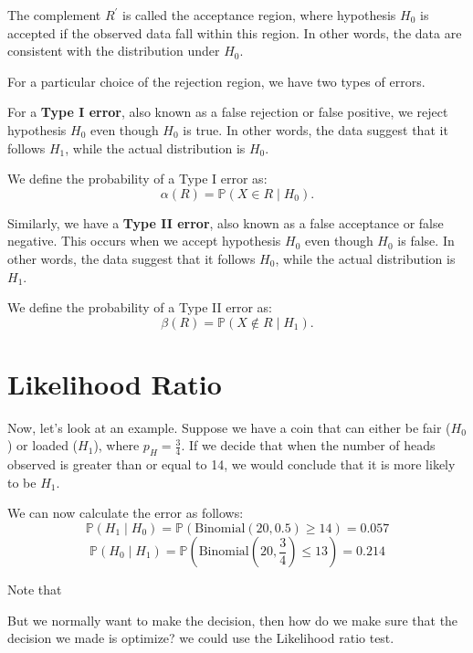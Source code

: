 The complement \(R^{\prime}\) is called the acceptance region, where hypothesis \(H_0\) is accepted if the observed data fall within this region. In other words, the data are consistent with the distribution under \(H_0\).

For a particular choice of the rejection region, we have two types of errors.

For a \textbf{Type I error}, also known as a false rejection or false positive, we reject hypothesis \(H_0\) even though \(H_0\) is true. In other words, the data suggest that it follows \(H_1\), while the actual distribution is \(H_0\).

We define the probability of a Type I error as:  
\[
  \alpha (R) = \mathbb{P}(X \in R \mid H_0).
\]

Similarly, we have a \textbf{Type II error}, also known as a false acceptance or false negative. This occurs when we accept hypothesis \(H_0\) even though \(H_0\) is false. In other words, the data suggest that it follows \(H_0\), while the actual distribution is \(H_1\).

We define the probability of a Type II error as:  
\[
  \beta (R) = \mathbb{P}(X \notin R \mid H_1).
\]

\section{Likelihood Ratio}
Now, let's look at an example. Suppose we have a coin that can either be fair (\(H_0\)) or loaded (\(H_1\)), where \(p_H = \frac{3}{4}\). If we decide that when the number of heads observed is greater than or equal to 14, we would conclude that it is more likely to be \(H_1\).  

We can now calculate the error as follows:  
\[
  \mathbb{P}(H_1 \mid H_0) = \mathbb{P}(\text{Binomial}(20, 0.5) \geq 14) = 0.057
\]  
\[
  \mathbb{P}(H_0 \mid H_1) = \mathbb{P}(\text{Binomial}(20, \frac{3}{4}) \leq 13) = 0.214
\]

Note that 

But we normally want to make the decision, then how do we make sure that the decision we made is optimize? we could use the Likelihood ratio test. 